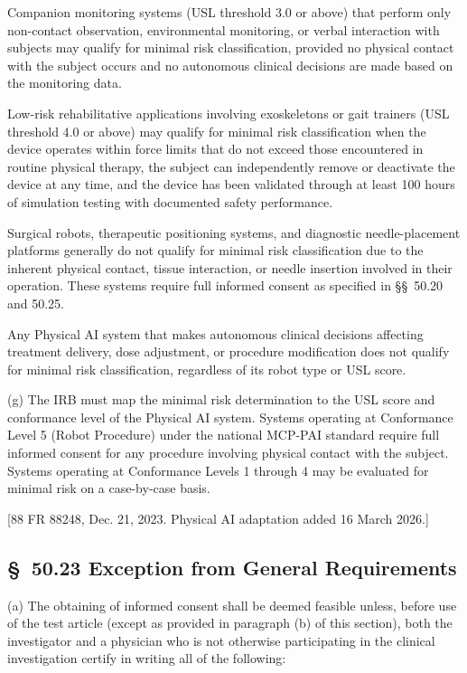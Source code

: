 \documentclass[11pt]{article}
\begin{document}
\begin{description}[leftmargin=1.0cm,style=sameline]
\item[(1)] Companion monitoring systems (USL threshold 3.0 or above) that perform only non-contact observation, environmental monitoring, or verbal interaction with subjects may qualify for minimal risk classification, provided no physical contact with the subject occurs and no autonomous clinical decisions are made based on the monitoring data.
\item[(2)] Low-risk rehabilitative applications involving exoskeletons or gait trainers (USL threshold 4.0 or above) may qualify for minimal risk classification when the device operates within force limits that do not exceed those encountered in routine physical therapy, the subject can independently remove or deactivate the device at any time, and the device has been validated through at least 100 hours of simulation testing with documented safety performance.
\item[(3)] Surgical robots, therapeutic positioning systems, and diagnostic needle-placement platforms generally do not qualify for minimal risk classification due to the inherent physical contact, tissue interaction, or needle insertion involved in their operation. These systems require full informed consent as specified in \S\S~50.20 and 50.25.
\item[(4)] Any Physical AI system that makes autonomous clinical decisions affecting treatment delivery, dose adjustment, or procedure modification does not qualify for minimal risk classification, regardless of its robot type or USL score.
\end{description}

(g) The IRB must map the minimal risk determination to the USL score and conformance level of the Physical AI system. Systems operating at Conformance Level 5 (Robot Procedure) under the national MCP-PAI standard require full informed consent for any procedure involving physical contact with the subject. Systems operating at Conformance Levels 1 through 4 may be evaluated for minimal risk on a case-by-case basis.

[88 FR 88248, Dec. 21, 2023. Physical AI adaptation added 16 March 2026.]

\subsection{\S~50.23 Exception from General Requirements}

(a) The obtaining of informed consent shall be deemed feasible unless, before use of the test article (except as provided in paragraph (b) of this section), both the investigator and a physician who is not otherwise participating in the clinical investigation certify in writing all of the following:
\end{document}
